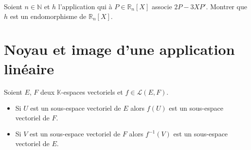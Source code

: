 \documentclass[a4paper,10pt]{report}
\begin{document}
\begin{exa} Soient $n \in \mathbb{N}$ et $h$ l'application qui à $P \in \mathbb{R}_n[X]$ associe $2P-3XP'$. Montrer que $h$ est un endomorphisme de $\mathbb{R}_n[X]$.
\end{exa}

\section{Noyau et image d'une application linéaire}

\begin{thm} Soient $E$, $F$ deux $\mathbb{K}$-espaces vectoriels et $f \in \mathcal{L}(E,F)$.

\begin{itemize}
\item Si $U$ est un sous-espace vectoriel de $E$ alors $f(U)$ est un sous-espace vectoriel de $F$.
\item Si $V$ est un sous-espace vectoriel de $F$ alors $f^{-1}(V)$ est un sous-espace vectoriel de $E$.
\end{itemize}
\end{thm}

\begin{preuve}
%
%
%
%
%

\vspace{12cm}
 \end{preuve}
 
\end{document}
